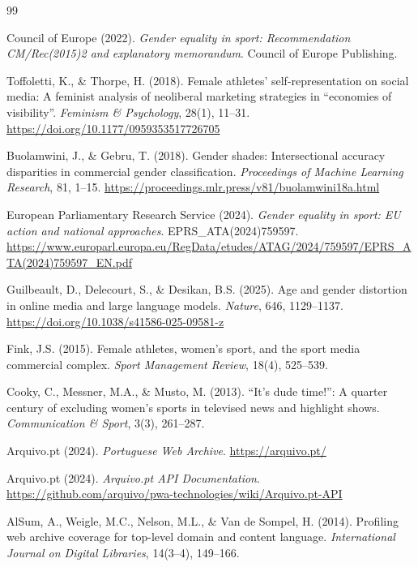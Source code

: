 \documentclass[11pt,a4paper]{article}
\begin{document}
\begin{thebibliography}{99}

Council of Europe (2022).
\textit{Gender equality in sport: Recommendation CM/Rec(2015)2 and explanatory memorandum}.
Council of Europe Publishing.

Toffoletti, K., \& Thorpe, H. (2018).
Female athletes' self-representation on social media: A feminist analysis of neoliberal marketing strategies in ``economies of visibility''.
\textit{Feminism \& Psychology}, 28(1), 11--31.
\url{https://doi.org/10.1177/0959353517726705}

Buolamwini, J., \& Gebru, T. (2018).
Gender shades: Intersectional accuracy disparities in commercial gender classification.
\textit{Proceedings of Machine Learning Research}, 81, 1--15.
\url{https://proceedings.mlr.press/v81/buolamwini18a.html}

European Parliamentary Research Service (2024).
\textit{Gender equality in sport: EU action and national approaches}.
EPRS\_ATA(2024)759597.
\newline\url{https://www.europarl.europa.eu/RegData/etudes/ATAG/2024/759597/EPRS_ATA(2024)759597_EN.pdf}

Guilbeault, D., Delecourt, S., \& Desikan, B.S. (2025).
Age and gender distortion in online media and large language models.
\textit{Nature}, 646, 1129–1137.
\url{https://doi.org/10.1038/s41586-025-09581-z}

Fink, J.S. (2015).
Female athletes, women's sport, and the sport media commercial complex.
\textit{Sport Management Review}, 18(4), 525–539.

Cooky, C., Messner, M.A., \& Musto, M. (2013).
``It's dude time!'': A quarter century of excluding women's sports in televised news and highlight shows.
\textit{Communication \& Sport}, 3(3), 261–287.



Arquivo.pt (2024).
\textit{Portuguese Web Archive}.
\url{https://arquivo.pt/}

Arquivo.pt (2024).
\textit{Arquivo.pt API Documentation}.
\url{https://github.com/arquivo/pwa-technologies/wiki/Arquivo.pt-API}

AlSum, A., Weigle, M.C., Nelson, M.L., \& Van de Sompel, H. (2014).
Profiling web archive coverage for top-level domain and content language.
\textit{International Journal on Digital Libraries}, 14(3–4), 149–166.


\end{thebibliography}
\end{document}
